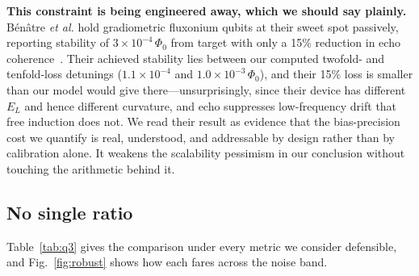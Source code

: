 \documentclass{SciPost}
\begin{document}
\textbf{This constraint is being engineered away, which we should say plainly.} B\'en\^atre
\emph{et al.} hold gradiometric fluxonium qubits at their sweet spot passively, reporting
stability of $3\times10^{-4}\,\Phi_0$ from target with only a 15\% reduction in echo
coherence~\cite{benatre2025}. Their achieved stability lies between our computed twofold- and tenfold-loss detunings
($1.1\times10^{-4}$ and $1.0\times10^{-3}\,\Phi_0$), and their 15\% loss is smaller than our model would
give there---unsurprisingly, since their device has different $E_L$ and hence different curvature, and
echo suppresses low-frequency drift that free induction does not. We read their result as evidence that the bias-precision cost we quantify is real,
understood, and addressable by design rather than by calibration alone. It weakens the
scalability pessimism in our conclusion without touching the arithmetic behind it.

\subsection{No single ratio}

Table~\ref{tab:q3} gives the comparison under every metric we consider defensible, and
Fig.~\ref{fig:robust} shows how each fares across the noise band.
\end{document}
